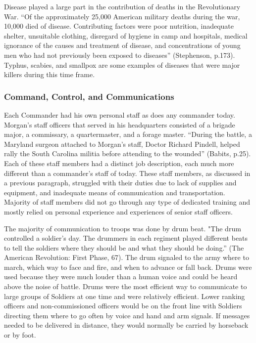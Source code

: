 Disease played a large part in the contribution of deaths in the Revolutionary
War.  “Of the approximately 25,000 American military deaths during the war,
10,000 died of disease.  Contributing factors were poor nutrition, inadequate
shelter, unsuitable clothing, disregard of hygiene in camp and hospitals,
medical ignorance of the causes and treatment of disease, and concentrations of
young men who had not previously been exposed to diseases” (Stephenson, p.173).
Typhus, scabies, and smallpox are some examples of diseases that were major
killers during this time frame.

\subsubsection{Command, Control, and Communications}

Each Commander had his own personal staff as does any commander today.  Morgan’s
staff officers that served in his headquarters consisted of a brigade major, a
commissary, a quartermaster, and a forage master.  “During the battle, a
Maryland surgeon attached to Morgan’s staff, Doctor Richard Pindell, helped
rally the South Carolina militia before attending to the wounded” (Babits,
p.25).  Each of these staff members had a distinct job description, each much
more different than a commander’s staff of today.  These staff members, as
discussed in a previous paragraph, struggled with their duties due to lack of
supplies and equipment, and inadequate means of communication and
transportation.  Majority of staff members did not go through any type of
dedicated training and mostly relied on personal experience and experiences of
senior staff officers.  

The majority of communication to troops was done by drum beat.  "The drum
controlled a soldier’s day.  The drummers in each regiment played different
beats to tell the soldiers where they should be and what they should be doing.”
(The American Revolution: First Phase, 67).  The drum signaled to the army where
to march, which way to face and fire, and when to advance or fall back.  Drums
were used because they were much louder than a human voice and could be heard
above the noise of battle.  Drums were the most efficient way to communicate to
large groups of Soldiers at one time and were relatively efficient.  Lower
ranking officers and non-commissioned officers would be on the front line with
Soldiers directing them where to go often by voice and hand and arm signals.  If
messages needed to be delivered in distance, they would normally be carried by
horseback or by foot.     

